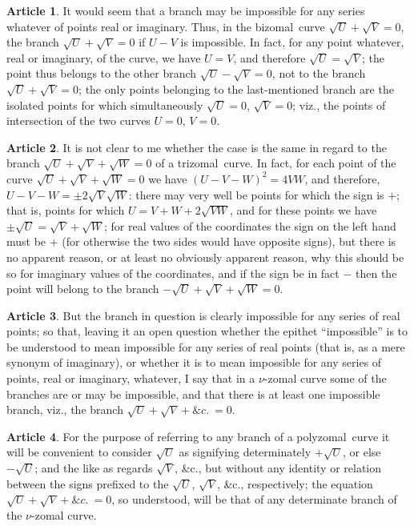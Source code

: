 \documentclass[11pt,a4paper]{article}
\theoremstyle{definition}
\newtheorem{art}{Article}
\newcommand{\polyzomal}{polyzomal}
\newcommand{\bizomal}{bizomal}
\newcommand{\trizomal}{trizomal}
\begin{document}
\begin{art}
It would seem that a branch may be impossible for any series whatever of points real or imaginary. Thus, in the \bizomal\ curve $\sqrt{U} + \sqrt{V} = 0$, the branch $\sqrt{U} + \sqrt{V} = 0$ if $U - V$ is impossible. In fact, for any point whatever, real or imaginary, of the curve, we have $U = V$, and therefore $\sqrt{U} = \sqrt{V}$; the point thus belongs to the other branch $\sqrt{U} - \sqrt{V} = 0$, not to the branch $\sqrt{U} + \sqrt{V} = 0$; the only points belonging to the last-mentioned branch are the isolated points for which simultaneously $\sqrt{U} = 0$, $\sqrt{V} = 0$; viz., the points of intersection of the two curves $U = 0$, $V = 0$.
\end{art}

\begin{art}
It is not clear to me whether the case is the same in regard to the branch $\sqrt{U} + \sqrt{V} + \sqrt{W} = 0$ of a \trizomal\ curve. In fact, for each point of the curve $\sqrt{U} + \sqrt{V} + \sqrt{W} = 0$ we have $(U - V - W)^{2} = 4VW$, and therefore, $U - V - W = \pm 2\sqrt{V}\sqrt{W}$: there may very well be points for which the sign is $+$; that is, points for which $U = V + W + 2\sqrt{VW}$, and for these points we have $\pm\sqrt{U} = \sqrt{V} + \sqrt{W}$; for real values of the coordinates the sign on the left hand must be $+$ (for otherwise the two sides would have opposite signs), but there is no apparent reason, or at least no obviously apparent reason, why this should be so for imaginary values of the coordinates, and if the sign be in fact $-$ then the point will belong to the branch $-\sqrt{U} + \sqrt{V} + \sqrt{W} = 0$.
\end{art}

\begin{art}
But the branch in question is clearly impossible for any series of real points; so that, leaving it an open question whether the epithet ``impossible'' is to be understood to mean impossible for any series of real points (that is, as a mere synonym of imaginary), or whether it is to mean impossible for any series of points, real or imaginary, whatever, I say that in a $\nu$-zomal curve some of the branches are or may be impossible, and that there is at least one impossible branch, viz., the branch $\sqrt{U} + \sqrt{V} + \&c.\ = 0$.
\end{art}

\begin{art}
For the purpose of referring to any branch of a \polyzomal\ curve it will be convenient to consider $\sqrt{U}$ as signifying determinately $+\sqrt{U}$, or else $-\sqrt{U}$; and the like as regards $\sqrt{V}$, \&c., but without any identity or relation between the signs prefixed to the $\sqrt{U}$, $\sqrt{V}$, \&c., respectively; the equation $\sqrt{U} + \sqrt{V} + \&c.\ = 0$, so understood, will be that of any determinate branch of the $\nu$-zomal curve.
\end{art}
\end{document}

